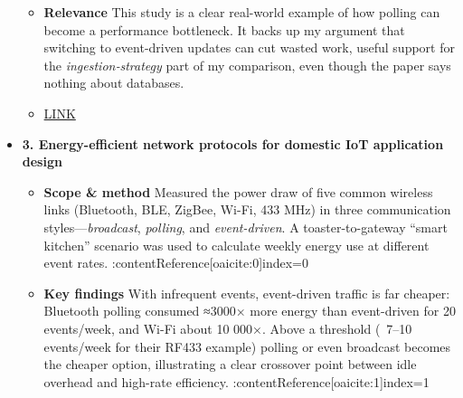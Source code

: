\documentclass[11pt]{article}
\begin{document}
\begin{itemize}
\begin{itemize}
      \item[] \textbf{Relevance} This study is a clear real-world example of how polling can become a performance bottleneck.  It backs up my argument that switching to event-driven updates can cut wasted work, useful support for the \textit{ingestion‐strategy} part of my comparison, even though the paper says nothing about databases.
      \item[] \href{https://link.springer.com/article/10.1186/s13677-017-0080-5}{LINK}
  \end{itemize}
  \item[] \textbf{3. Energy-efficient network protocols for domestic IoT application design}
  \begin{itemize}
      \item[] \textbf{Scope \& method} Measured the power draw of five common wireless links (Bluetooth, BLE, ZigBee, Wi-Fi, 433 MHz) in three communication styles—\emph{broadcast}, \emph{polling}, and \emph{event-driven}.  
      A toaster-to-gateway “smart kitchen” scenario was used to calculate weekly energy use at different event rates. :contentReference[oaicite:0]{index=0}
      
      \item[] \textbf{Key findings} With infrequent events, event-driven traffic is far cheaper: Bluetooth polling consumed ≈3000× more energy than event-driven for 20 events/week, and Wi-Fi about 10 000×.  
      Above a threshold (~7–10 events/week for their RF433 example) polling or even broadcast becomes the cheaper option, illustrating a clear crossover point between idle overhead and high-rate efficiency. :contentReference[oaicite:1]{index=1}
      

\end{itemize}
\end{itemize}
\end{document}
